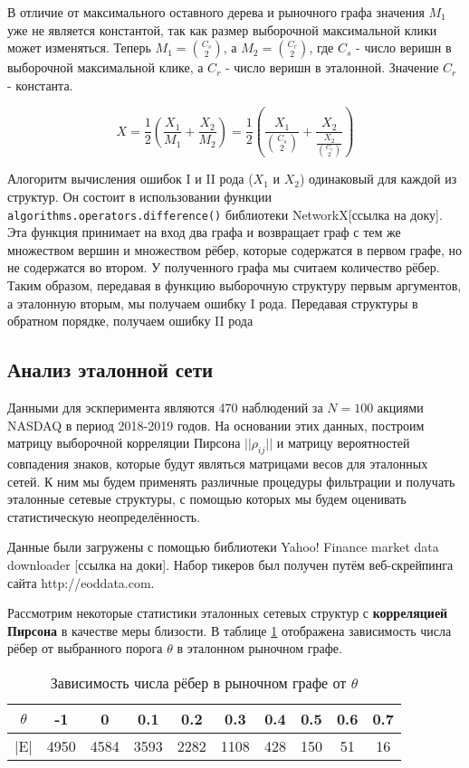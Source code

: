 В отличие от максимального оставного дерева и рыночного графа значения $M_1$ уже не является константой, так как размер выборочной максимальной клики может изменяться. Теперь $M_1 = \binom{C_s}{2}$, а $M_2 = \binom{C_r}{2}$, где $C_s$ - число веришн в выборочной максимальной клике, а $C_r$ - число веришн в эталонной. Значение $C_r$ - константа.

\begin{equation}
X = \frac{1}{2}\left(\frac{X_1}{M_1} + \frac{X_2}{M_2}\right) = \frac{1}{2}\left(\frac{X_1}{\binom{C_s}{2}} + \frac{X_2}{\frac{X_2}{\binom{C_r}{2}}}\right)
\end{equation}


Алогоритм вычисления ошибок I и II рода ($X_1$ и $X_2$) одинаковый для каждой из структур. Он состоит в использовании функции  \verb|algorithms.operators.difference()| библиотеки NetworkX[ссылка на доку]. Эта функция принимает на вход два графа и возвращает граф с тем же множеством вершин  и множеством рёбер, которые содержатся в первом графе, но не содержатся во втором. У полученного графа мы считаем количество рёбер. Таким образом, передавая в функцию выборочную структуру первым аргументов, а эталонную вторым, мы получаем ошибку I рода. Передавая структуры в обратном порядке, получаем ошибку II рода


\subsection{Анализ эталонной сети}

Данными для эскперимента являются 470 наблюдений за $N=100$ акциями NASDAQ в период 2018-2019 годов. На основании этих данных, построим матрицу выборочной корреляции Пирсона $||\rho_{i j}||$ и матрицу вероятностей совпадения знаков, которые будут являться матрицами весов для эталонных сетей. К ним мы будем применять различные процедуры фильтрации и получать эталонные сетевые структуры, с помощью которых мы будем оценивать статистическую неопределённость.

Данные были загружены с помощью библиотеки Yahoo! Finance market data downloader [ссылка на доки]. Набор тикеров был получен путём веб-скрейпинга сайта http://eoddata.com.

Рассмотрим некоторые статистики эталонных сетевых структур с\textbf{ корреляцией Пирсона} в качестве меры близости. В таблице \ref{table:mg_size} отображена зависимость числа рёбер от выбранного порога $\theta$ в эталонном рыночном графе.

\begin{table}[h!]
\centering
\begin{tabular}{ |c|c|c|c|c|c|c|c|c|c| } 
 \hline
 $\theta$ & -1 & 0 & 0.1 & 0.2 & 0.3 & 0.4 & 0.5 & 0.6 & 0.7 \\ 
 \hline
 |E|	  & 4950 & 4584 & 3593 & 2282 & 1108 & 428 & 150 & 51 & 16\\ 
 \hline
\end{tabular}
\caption{Зависимость числа рёбер в рыночном графе от $\theta$}
\label{table:mg_size}
\end{table}


